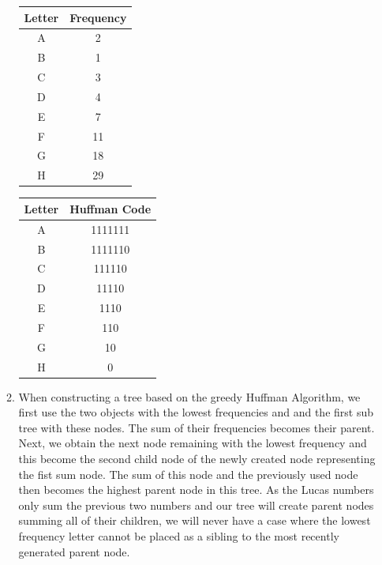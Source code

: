 \documentclass[12pt]{article}
\begin{document}
\begin{enumerate}
\begin{enumerate}
    \begin{left}
    \begin{tabular}{ |c|c| } 
    \hline
    Letter & Frequency \\
     \hline
     A & 2 \\
     B & 1 \\
     C & 3 \\
     D & 4 \\
     E & 7 \\
     F & 11 \\
     G & 18 \\
     H & 29 \\
     
     \hline
    \end{tabular}
    \end{left}
    
    \begin{right}
    \begin{tabular}{ |c|c| } 
    \hline
    Letter & Huffman Code \\
     \hline
     A & 1111111 \\
     B & 1111110 \\
     C & 111110 \\
     D & 11110 \\
     E & 1110 \\
     F & 110 \\
     G & 10 \\
     H & 0 \\
     
     \hline
    \end{tabular}
    \end{right}
    
    \item
    When constructing a tree based on the greedy Huffman Algorithm, we first use the two objects with the lowest frequencies and and the first sub tree with these nodes. The sum of their frequencies becomes their parent. Next, we obtain the next node remaining with the lowest frequency and this become the second child node of the newly created node representing the fist sum node. The sum of this node and the previously used node then becomes the highest parent node in this tree. As the Lucas numbers only sum the previous two numbers and our tree will create parent nodes summing all of their children, we will never have a case where the lowest frequency letter cannot be placed as a sibling to the most recently generated parent node.
    

\end{enumerate}
\end{enumerate}
\end{document}
